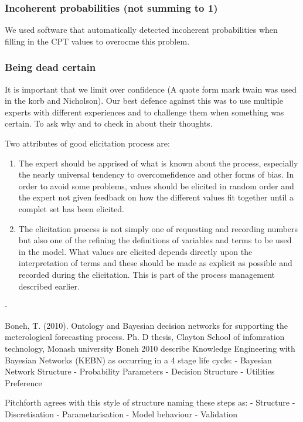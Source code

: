 \subsubsection{Incoherent probabilities (not summing to 1)}
We used software that automatically detected incoherent probabilities when filling in the CPT values to overocme this problem.
\subsubsection{Being dead certain}
It is important that we limit over confidence (A quote form mark twain was used in the korb and Nicholson). 
Our best defence against this was to use multiple experts with different experiences and to challenge them when something was certain. To ask why and to check in about their thoughts.

\citep{morganUncertaintyGuideDealing1990}
Two attributes of good elicitation process are:
\begin{enumerate}
        \item The expert should be apprised of what is known about the process, especially the nearly universal tendency to overcomefidence and other forms of bias. In order to avoid some problems, values should be elicited in random order and the expert not given feedback on how the different values fit together until a complet set has been elicited.
        \item The elicitation process is not simply one of requesting and recording numbers but also one of the refining the definitions of variables and terms to be used in the model. What values are elicited depends directly upon the interpretation of terms and these should be made as explicit as possible and recorded during the elicitation. This is part of the process management described earlier.
\end{enumerate}
- 

\citep{Boneh2021} Boneh, T. (2010). Ontology and Bayesian decision networks for supporting the meterological forecasting process. Ph. D thesis, Clayton School of infomration technology, Monash university
Boneh 2010 describe Knowledge Engineering with Bayesian Networks (KEBN) as occurring in a 4 stage life cycle:
- Bayesian Network Structure
- Probability Parameters
- Decision Structure
- Utilities Preference

Pitchforth \citep{pitchforthProposedValidationFramework2013} agrees with this style of structure naming these steps as:
- Structure
- Discretisation
- Parametarisation
- Model behaviour
- Validation


